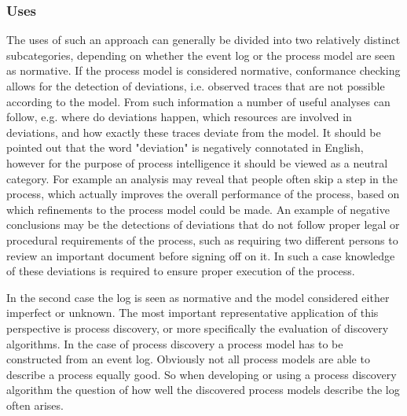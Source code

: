 \documentclass[runningheads]{template/llncs}
\begin{document}
\subsubsection{Uses}
The uses of such an approach can generally be divided into two relatively distinct subcategories, depending on whether the event log or the process model are seen as normative.
If the process model is considered normative, conformance checking allows for the detection of deviations, i.e. observed traces that are not possible according to the model.
From such information a number of useful analyses can follow, e.g. where do deviations happen, which resources are involved in deviations, and how exactly these traces deviate from the model.
It should be pointed out that the word "deviation" is negatively connotated in English, however for the purpose of process intelligence it should be viewed as a neutral category. 
For example an analysis may reveal that people often skip a step in the process, which actually improves the overall performance of the process, based on which refinements to the process model could be made.
An example of negative conclusions may be the detections of deviations that do not follow proper legal or procedural requirements of the process, such as requiring two different persons to review an important document before signing off on it. In such a case knowledge of these deviations is required to ensure proper execution of the process.

In the second case the log is seen as normative and the model considered either imperfect or unknown.
The most important representative application of this perspective is process discovery, or more specifically the evaluation of discovery algorithms.
In the case of process discovery a process model has to be constructed from an event log.
Obviously not all process models are able to describe a process equally good.
So when developing or using a process discovery algorithm the question of how well the discovered process models describe the log often arises.
\end{document}
